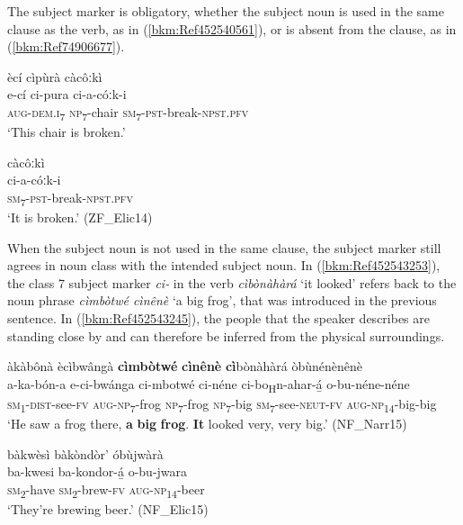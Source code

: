 The subject marker is obligatory, whether the subject noun is used in the same clause as the verb, as in (\ref{bkm:Ref452540561}), or is absent from the clause, as in (\ref{bkm:Ref74906677}).\largerpage

\ea
\label{bkm:Ref452540561}
ècí cìpùrà càcôːkì\\
\gll e-cí    ci-pura  ci-a-cóːk-i\\
\textsc{aug}-\textsc{dem}.\textsc{i}\textsubscript{7}  \textsc{np}\textsubscript{7}-chair  \textsc{sm}\textsubscript{7}-\textsc{pst}-break-\textsc{npst}.\textsc{pfv}\\
\glt ‘This chair is broken.’
\z

\ea
\label{bkm:Ref74906677}
\glll càcôːkì \\
ci-a-cóːk-i\\
\textsc{sm}\textsubscript{7}-\textsc{pst}-break-\textsc{npst}.\textsc{pfv}\\
\glt ‘It is broken.’ (ZF\_Elic14)
\z

When the subject noun is not used in the same clause, the subject marker still agrees in noun class with the intended subject noun. In (\ref{bkm:Ref452543253}), the class 7 subject marker \textit{ci-} in the verb \textit{cìbònàhàrá} ‘it looked’ refers back to the noun phrase \textit{cìmbòtwé cìnênè} ‘a big frog’, that was introduced in the previous sentence. In (\ref{bkm:Ref452543245}), the people that the speaker describes are standing close by and can therefore be inferred from the physical surroundings.

\ea
\label{bkm:Ref452543253}
àkàbônà ècìbwângà \textbf{cìmbòtwé} \textbf{cìnênè} \textbf{cì}bònàhàrá òbùnénènênè\\
\gll a-ka-bón-a    e-ci-bwánga    ci-mbotwé  ci-néne ci-bo\textsubscript{H}n-ahar-á̲  o-bu-néne-néne\\
\textsc{sm}\textsubscript{1}-\textsc{dist}-see-\textsc{fv}  \textsc{aug}-\textsc{np}\textsubscript{7}-frog  \textsc{np}\textsubscript{7}-frog  \textsc{np}\textsubscript{7}-big
\textsc{sm}\textsubscript{7}-see-\textsc{neut}-\textsc{fv}  \textsc{aug}-\textsc{np}\textsubscript{14}-big-big\\
\glt ‘He saw a frog there, \textbf{a} \textbf{big} \textbf{frog}. \textbf{It} looked very, very big.’ (NF\_Narr15)
\z

\ea
\label{bkm:Ref452543245}
bàkwèsì bàkòndòr’ óbùjwàrà\\
\gll ba-kwesi  ba-kondor-á̲  o-bu-jwara\\
\textsc{sm}\textsubscript{2}-have  \textsc{sm}\textsubscript{2}-brew-\textsc{fv}  \textsc{aug}-\textsc{np}\textsubscript{14}-beer\\
\glt ‘They’re brewing beer.’ (NF\_Elic15)
\z

